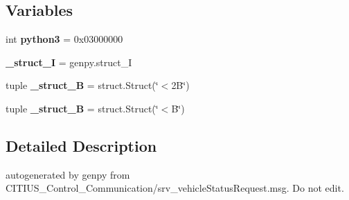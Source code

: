 \subsection*{\-Variables}
\begin{DoxyCompactItemize}
\item 
\hypertarget{namespace_c_i_t_i_u_s___control___communication_1_1srv_1_1__srv__vehicle_status_ae266bad4a0186b7c9751924694ccdffe}{int {\bfseries python3} = 0x03000000}\label{namespace_c_i_t_i_u_s___control___communication_1_1srv_1_1__srv__vehicle_status_ae266bad4a0186b7c9751924694ccdffe}

\item 
\hypertarget{namespace_c_i_t_i_u_s___control___communication_1_1srv_1_1__srv__vehicle_status_a95e34b264817be38dacdb438eef65e26}{{\bfseries \-\_\-struct\-\_\-\-I} = genpy.\-struct\-\_\-\-I}\label{namespace_c_i_t_i_u_s___control___communication_1_1srv_1_1__srv__vehicle_status_a95e34b264817be38dacdb438eef65e26}

\item 
\hypertarget{namespace_c_i_t_i_u_s___control___communication_1_1srv_1_1__srv__vehicle_status_a61819937adbac8fe9b4735f9c3ff9550}{tuple {\bfseries \-\_\-struct\-\_\-B} = struct.\-Struct(\char`\"{}$<$2\-B\char`\"{})}\label{namespace_c_i_t_i_u_s___control___communication_1_1srv_1_1__srv__vehicle_status_a61819937adbac8fe9b4735f9c3ff9550}

\item 
\hypertarget{namespace_c_i_t_i_u_s___control___communication_1_1srv_1_1__srv__vehicle_status_acbdab7fd6174153c3ed06e36b8aeb23b}{tuple {\bfseries \-\_\-struct\-\_\-\-B} = struct.\-Struct(\char`\"{}$<$\-B\char`\"{})}\label{namespace_c_i_t_i_u_s___control___communication_1_1srv_1_1__srv__vehicle_status_acbdab7fd6174153c3ed06e36b8aeb23b}

\end{DoxyCompactItemize}


\subsection{\-Detailed \-Description}
\begin{DoxyVerb}autogenerated by genpy from CITIUS_Control_Communication/srv_vehicleStatusRequest.msg. Do not edit.\end{DoxyVerb}
 